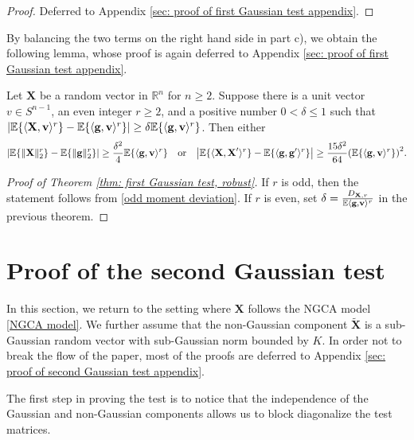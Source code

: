 \documentclass[final,12pt]{colt2018} %
\numberwithin{equation}{section}
\DeclarePairedDelimiter{\abs}{\lvert}{\rvert}
\DeclarePairedDelimiter{\norm}{\lVert}{\rVert}
\DeclarePairedDelimiter{\paren}{(}{)}
\DeclarePairedDelimiter{\braces}{\lbrace}{\rbrace}
\DeclarePairedDelimiter{\inprod}{\langle}{\rangle}
\newcommand{\E}{\mathbb{E}}
\newcommand{\R}{\mathbb{R}}
\newcommand{\boldg}{\textbf{g}}
\newcommand{\boldv}{\textbf{v}}
\newcommand{\boldX}{\textbf{X}}
\begin{document}
\begin{proof}
	Deferred to Appendix \ref{sec: proof of first Gaussian test appendix}.
\end{proof}

By balancing the two terms on the right hand side in part c), we obtain the following lemma, whose proof is again deferred to Appendix \ref{sec: proof of first Gaussian test appendix}.

\begin{lemma} \label{lem: comparison for even moments}
	Let $\boldX$ be a random vector in $\R^n$ for $n \geq 2$. Suppose there is a unit vector $v \in S^{n-1}$, an even integer $r \geq 2$, and a positive number $0 < \delta \leq 1$ such that $\abs*{\E\braces{\inprod{\boldX,\boldv}^r} - \E\braces{ \inprod{\boldg,\boldv}^r} } \geq \delta\E\braces{ \inprod{\boldg,\boldv}^r}$. Then either
	\[
	\abs*{\E\braces{\norm{\boldX}_2^r}-\E\braces{\norm{\boldg}_2^r}} \geq \frac{\delta^2}{4}\E\braces{ \inprod{\boldg,\boldv}^r}
	\quad \text{or} \quad
	\abs*{\E\braces{\inprod{\boldX,\boldX'}^r} - \E\braces{\inprod{\boldg,\boldg'}^r}} \geq \frac{15\delta^2}{64} \paren*{\E\braces{ \inprod{\boldg,\boldv}^r}}^2.
	\]
\end{lemma}

\begin{proof}[Proof of Theorem \ref{thm: first Gaussian test, robust}]
	If $r$ is odd, then the statement follows from \eqref{odd moment deviation}. If $r$ is even, set $\delta = \frac{D_{\boldX,r}}{\E\inprod{\boldg,\boldv}^r}$ in the previous theorem.
\end{proof}

\section{Proof of the second Gaussian test} \label{sec: proof of second Gaussian test}

In this section, we return to the setting where $\boldX$ follows the NGCA model \eqref{NGCA model}. We further assume that the non-Gaussian component $\tilde{\boldX}$ is a sub-Gaussian random vector with sub-Gaussian norm bounded by $K$. In order not to break the flow of the paper, most of the proofs are deferred to Appendix \ref{sec: proof of second Gaussian test appendix}.

The first step in proving the test is to notice that the independence of the Gaussian and non-Gaussian components allows us to block diagonalize the test matrices.
\end{document}
